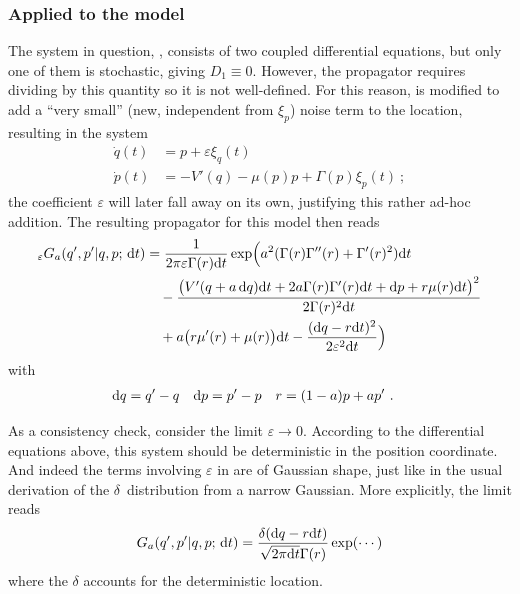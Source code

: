 \subsubsection{Applied to the model}

The system in question, , consists of two coupled differential equations, but only one of them is stochastic, giving \(D_1\equiv0\). However, the propagator  requires dividing by this quantity so it is not well-defined. For this reason,  is modified to add a ``very small'' (new, independent from \(\xi_p\)) noise term to the location, resulting in the system
%
\begin{equation}
	\label{eqn:underdamped sde epsilon}
	\begin{split}
		\dot q(t) &= p + \varepsilon \xi_q(t) \\
		\dot p(t) &= -V'(q) - \mu(p)p + \Gamma(p)\xi_p(t) ~;
	\end{split}
\end{equation}
%
the coefficient \(\varepsilon\) will later fall away on its own, justifying this rather ad-hoc addition.
The resulting propagator for this model then reads 
%
\begin{equation}
	\label{eqn:short time propagator}
	\begin{split}
		_\varepsilon G_a (q',p' | q,p;\,\mathrm{d} t)
		&= \frac1{2\pi\varepsilon\Gamma(r)\mathrm{d} t}
			\operatorname{exp}\Bigl(
				a^2(\Gamma(r)\Gamma''(r) + \Gamma'(r)^2)\mathrm{d} t
			\\&\quad
			-\frac{\bigl(V'(q+a\,\mathrm{d} q)\mathrm{d} t + 2 a\Gamma(r)\Gamma'(r)\mathrm{d} t + \mathrm{d} p + r\mu(r)\mathrm{d} t\bigr)^2}{2\Gamma(r)^2\mathrm{d} t}
			\\&\quad
			+ a\bigl(r\mu'(r)+\mu(r)\bigr)\mathrm{d} t
			- \frac{(\mathrm{d} q - r\mathrm{d} t)^2}{2\varepsilon^2\mathrm{d} t}
			\Bigr)
	\end{split}
\end{equation}
%
with
\begin{align*}
	\mathrm{d} q &= q' - q  &  \mathrm{d} p &= p' - p  &  r &= (1-a)p + ap' ~.
\end{align*}

As a consistency check, consider the limit \(\varepsilon\to0\). According to the differential equations above, this system should be deterministic in the position coordinate. And indeed the terms involving \(\varepsilon\) in  are of Gaussian shape, just like in the usual derivation of the \(\delta\)~distribution from a narrow Gaussian. More explicitly, the limit reads
%
\begin{equation}
	\label{eqn:delta-limit}
	\begin{split}
		G_a (q',p' | q,p;\,\mathrm{d} t) =
		\frac{\delta(\mathrm{d} q-r\mathrm{d} t)}{\sqrt{2\pi\mathrm{d} t}\Gamma(r)}\operatorname{exp}(\cdots)
	\end{split}
\end{equation}
%
where the \(\delta\) accounts for the deterministic location.



